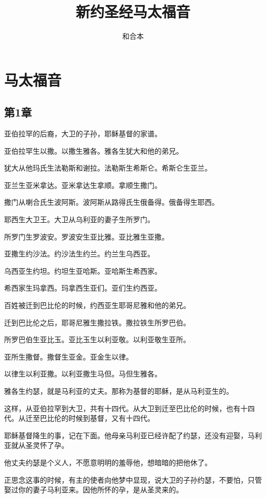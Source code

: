 \documentclass[12pt,oneside]{book}
\title{新约圣经马太福音}
\author{和合本}
\begin{document}

\frontmatter


\setcounter{tocdepth}{2}    
\tableofcontents

\mainmatter
\part{马太福音}
\chapter{第1章}
亚伯拉罕的后裔，大卫的子孙，耶稣基督的家谱。

亚伯拉罕生以撒。以撒生雅各。雅各生犹大和他的弟兄。

犹大从他玛氏生法勒斯和谢拉。法勒斯生希斯仑。希斯仑生亚兰。

亚兰生亚米拿达。亚米拿达生拿顺。拿顺生撒门。

撒门从喇合氏生波阿斯。波阿斯从路得氏生俄备得。俄备得生耶西。

耶西生大卫王。大卫从乌利亚的妻子生所罗门。

所罗门生罗波安。罗波安生亚比雅。亚比雅生亚撒。

亚撒生约沙法。约沙法生约兰。约兰生乌西亚。

乌西亚生约坦。约坦生亚哈斯。亚哈斯生希西家。

希西家生玛拿西。玛拿西生亚们。亚们生约西亚。

百姓被迁到巴比伦的时候，约西亚生耶哥尼雅和他的弟兄。

迁到巴比伦之后，耶哥尼雅生撒拉铁。撒拉铁生所罗巴伯。

所罗巴伯生亚比玉。亚比玉生以利亚敬。以利亚敬生亚所。

亚所生撒督。撒督生亚金。亚金生以律。

以律生以利亚撒。以利亚撒生马但。马但生雅各。

雅各生约瑟，就是马利亚的丈夫。那称为基督的耶稣，是从马利亚生的。

这样，从亚伯拉罕到大卫，共有十四代。从大卫到迁至巴比伦的时候，也有十四代。从迁至巴比伦的时候到基督，又有十四代。

耶稣基督降生的事，记在下面。他母亲马利亚已经许配了约瑟，还没有迎娶，马利亚就从圣灵怀了孕。

他丈夫约瑟是个义人，不愿意明明的羞辱他，想暗暗的把他休了。

正思念这事的时候，有主的使者向他梦中显现，说大卫的子孙约瑟，不要怕，只管娶过你的妻子马利亚来。因他所怀的孕，是从圣灵来的。
\end{document}
